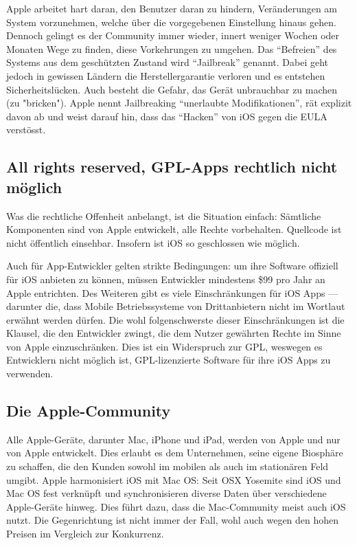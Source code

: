 Apple arbeitet hart daran, den Benutzer daran zu hindern, Veränderungen am System vorzunehmen, welche über die vorgegebenen Einstellung hinaus gehen. Dennoch gelingt es der Community immer wieder, innert weniger Wochen oder Monaten Wege zu finden, diese Vorkehrungen zu umgehen. Das ``Befreien'' des Systems aus dem geschützten Zustand wird ``Jailbreak'' genannt\thinspace\cite{online:ios-jailbreak}. Dabei geht jedoch in gewissen Ländern die Herstellergarantie verloren und es entstehen Sicherheitslücken. Auch besteht die Gefahr, das Gerät unbrauchbar zu machen (zu "bricken")\thinspace\cite{online:ios-whyjailbreak}. Apple nennt Jailbreaking ``unerlaubte Modifikationen'', rät explizit davon ab und weist darauf hin, dass das ``Hacken'' von iOS gegen die EULA verstösst\thinspace\cite{online:ios-dontjailbreak}.
\newline

\subsection{All rights reserved, GPL-Apps rechtlich nicht möglich}
Was die rechtliche Offenheit anbelangt, ist die Situation einfach: Sämtliche Komponenten sind von Apple entwickelt, alle Rechte vorbehalten. Quellcode ist nicht öffentlich einsehbar. Insofern ist iOS so geschlossen wie möglich.

Auch für \mbox{App-Entwickler} gelten strikte Bedingungen: um ihre Software offiziell für iOS anbieten zu können, müssen Entwickler mindestens \$99 pro Jahr an Apple entrichten\thinspace\cite{online:ios-appstore}. Des Weiteren gibt es viele Einschränkungen für iOS Apps --- darunter die, dass Mobile Betriebssysteme von Drittanbietern nicht im Wortlaut erwähnt werden dürfen\thinspace\cite{online:ios-guidelines}. Die wohl folgenschwerste dieser Einschränkungen ist die Klausel, die den Entwickler zwingt, die dem Nutzer gewährten Rechte im Sinne von Apple einzuschränken\thinspace\cite{online:ios-terms}. Dies ist ein Widerspruch zur GPL, weswegen es Entwicklern nicht möglich ist, \mbox{GPL-lizenzierte} Software für ihre iOS Apps zu verwenden\thinspace\cite{online:ios-gpl}.
\newline

\subsection{Die Apple-Community}
Alle Apple-Geräte, darunter Mac, iPhone und iPad, werden von Apple und nur von Apple entwickelt. Dies erlaubt es dem Unternehmen, seine eigene Biosphäre zu schaffen, die den Kunden sowohl im mobilen als auch im stationären Feld umgibt. Apple harmonisiert iOS mit Mac OS: Seit OS\thinspace X Yosemite sind iOS und Mac OS fest verknüpft und synchronisieren diverse Daten über verschiedene \mbox{Apple-Geräte} hinweg. Dies führt dazu, dass die \mbox{Mac-Community} meist auch iOS nutzt. Die Gegenrichtung ist nicht immer der Fall, wohl auch wegen den hohen Preisen im Vergleich zur Konkurrenz.

